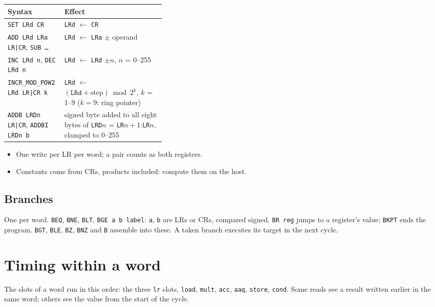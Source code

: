 \documentclass[11pt,a4paper]{article}
\begin{document}
\begin{center}
\small
\begin{tabularx}{\linewidth}{>{\raggedright\arraybackslash}p{0.36\linewidth}>{\raggedright\arraybackslash}X}
\toprule
Syntax & Effect \\
\midrule
\texttt{SET LRd CR} & \texttt{LRd} $\leftarrow$ \texttt{CR} \\
\texttt{ADD LRd LRa LR|CR}, \texttt{SUB \ldots} & \texttt{LRd} $\leftarrow$
\texttt{LRa} $\pm$ operand \\
\texttt{INC LRd n}, \texttt{DEC LRd n} & \texttt{LRd} $\leftarrow$
\texttt{LRd} $\pm n$, $n$ = 0--255 \\
\texttt{INCR\_MOD\_POW2 LRd LR|CR k} & \texttt{LRd} $\leftarrow$
$(\texttt{LRd} + \mathrm{step}) \bmod 2^k$, $k$ = 1--9 ($k = 9$: ring pointer) \\
\texttt{ADDB LRDn LR|CR}, \texttt{ADDBI LRDn b} & signed byte added to all eight
bytes of \texttt{LRD}$n$ = \texttt{LR}$n{+}1$:\texttt{LR}$n$, clamped to 0--255 \\
\bottomrule
\end{tabularx}
\end{center}

\begin{itemize}
\item One write per LR per word; a pair counts as both registers.
\item Constants come from CRs, products included: compute them on the host.
\end{itemize}

\subsection{Branches}

One per word. \texttt{BEQ}, \texttt{BNE}, \texttt{BLT}, \texttt{BGE a b label}:
\texttt{a}, \texttt{b} are LRs or CRs, compared signed. \texttt{BR reg} jumps to
a register's value; \texttt{BKPT} ends the program. \texttt{BGT}, \texttt{BLE},
\texttt{BZ}, \texttt{BNZ} and \texttt{B} assemble into these. A taken branch
executes its target in the next cycle.

\section{Timing within a word}\label{sec:timing}

The slots of a word run in this order: the three \texttt{lr}
slots, \texttt{load}, \texttt{mult}, \texttt{acc}, \texttt{aaq},
\texttt{store}, \texttt{cond}. Some reads see a result written earlier in
the same word; others see the value from the start of the cycle.
\end{document}
